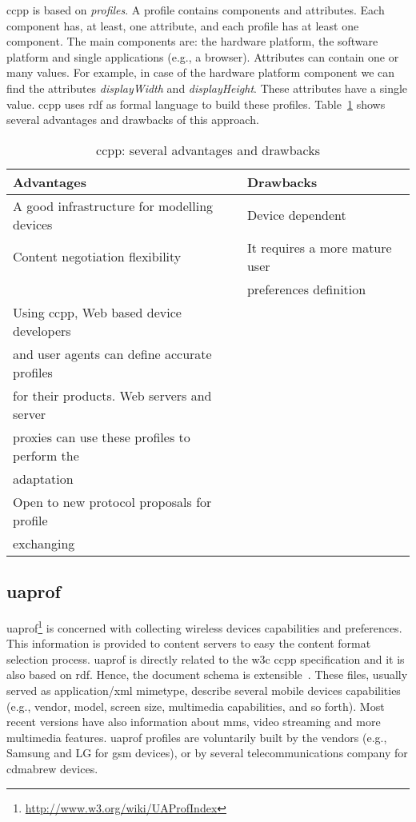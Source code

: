 \ac{ccpp} is based on \textit{profiles}. A profile contains components and attributes.
Each component has, at least, one attribute, and each profile has at least one
component. The main components are: the hardware platform, the software platform
and single applications (e.g., a browser). Attributes can contain one or many 
values. For example, in case of the hardware platform component we can find the 
attributes \textit{displayWidth} and \textit{displayHeight}. These attributes 
have a single value. \ac{ccpp} uses \ac{rdf} as formal language to build these 
profiles. Table~\ref{tbl:ccpp} shows several advantages and drawbacks of this 
approach.



\begin{table}
\caption{\ac{ccpp}: several advantages and drawbacks}
\label{tbl:ccpp}
\footnotesize
\centering
\begin{tabular}{l l}
  \hline
  \textbf{Advantages}				& \textbf{Drawbacks}			\\
  \hline
  A good infrastructure for modelling devices 	& Device dependent 			\\
  Content negotiation flexibility 		& It requires a more mature user 	\\
						& preferences definition 		\\
  Using \ac{ccpp}, Web based device developers	& 					\\
  and user agents can define accurate profiles 	&					\\
  for their products. Web servers and server 	&					\\
  proxies can use these profiles to perform the &					\\
  adaptation					&					\\
  Open to new protocol proposals for profile 	&					\\
  exchanging					&					\\
  \hline
\end{tabular}
\end{table}

\subsection{\ac{uaprof}}
\label{sec:uaprof}
\ac{uaprof}\footnote{\url{http://www.w3.org/wiki/UAProfIndex}} is concerned with collecting wireless devices 
capabilities and preferences. This information is provided to content servers 
to easy the content format selection process. \ac{uaprof} is directly related to 
the \ac{w3c} \ac{ccpp} specification and it is also based on \ac{rdf}. Hence, 
the document schema is extensible~\citep{butler_implementing_2001}\citep{butler_ccpp_2002}. 
These files, usually served as application/\ac{xml} mimetype, describe several mobile 
devices capabilities (e.g., vendor, model, screen size, multimedia capabilities, 
and so forth). Most recent versions have also information about \ac{mms}, video streaming 
and more multimedia features. \ac{uaprof} profiles are voluntarily built by the 
vendors (e.g., Samsung and LG for \acs{gsm} devices), or by several 
telecommunications company for \acs{cdmabrew} devices.

